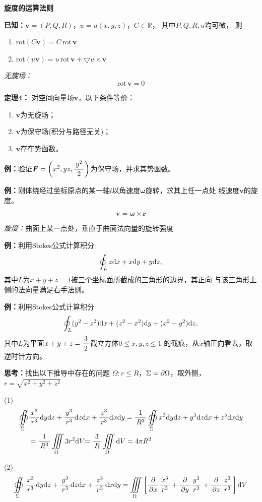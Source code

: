 {\bf 旋度的运算法则}

{\bf 已知：}$\bm{v}=(P,Q,R)$，$u=u(x,y,z)$，$C\in\mathbb{R}$， 
其中$P,Q,R,u$均可微， 则
\begin{enumerate}[(1)]
  \setlength{\itemindent}{1cm}
  \item ${\mathrm{rot}(C\bm{v}) =C\,\mathrm{rot}\,\bm{v}}$ 
  \item ${\mathrm{rot}(u\bm{v}) =u\,\mathrm{rot}\,\bm{v}
  +\bigtriangledown u\times\bm{v}}$
\end{enumerate}

{\it 无旋场：}
$${\mathrm{rot}\,\bm{v}=0}$$ 

{\bf 定理4：}
对空间向量场$\bm{v}$，以下条件等价： 
\begin{enumerate}[(1)]
  \setlength{\itemindent}{1cm}
  \item $\bm{v}$为无旋场； 
  \item $\bm{v}$为保守场(积分与路径无关)； 
  \item $\bm{v}$存在势函数。
\end{enumerate}

{\bf 例：}验证$\bm{F}=\left(x^2,yz,\displaystyle\frac{\,{y^2}\,}{\,{2}\,}\right)$为保守场，并求其势函数。

{\bf 例：}刚体绕经过坐标原点的某一轴$l$以角速度$\bm{\omega}$旋转，求其上任一点处
线速度$\bm{v}$的旋度。

$${\bm{v}=\bm{\omega}\times\bm{r}}$$

{\it 旋度：}曲面上某一点处，垂直于曲面法向量的旋转强度

{\bf 例：}利用Stokes公式计算积分
$$\oint_Lz\mathrm{d} x+x\mathrm{d} y+y\mathrm{d} z,$$
其中$L$为$x+y+z=1$被三个坐标面所截成的三角形的边界，其正向
与该三角形上侧的法向量满足右手法则。

{\bf 例：}利用Stokes公式计算积分
$$\oint_L(y^2-z^2)\mathrm{d} x+(z^2-x^2)\mathrm{d} y+(x^2-y^2)\mathrm{d} z,$$
其中$L$为平面$x+y+z=\displaystyle\frac{\,{3}\,}{\,{2}\,}$截立方体$0\leq x,y,z\leq 1$
的截痕，从$x$轴正向看去，取逆时针方向。

{\bf 思考：}找出以下推导中存在的问题
$\Omega:r\leq R$，$\Sigma=\partial\Omega$，取外侧，
$r=\sqrt{x^2+y^2+z^2}$

(1)
\begin{align*}
	\displaystyle\oiint\limits_{\Sigma}&\displaystyle\frac{\,{x^3}\,}{\,{r^3}\,}\mathrm{d}
  	y\mathrm{d} z+\displaystyle\frac{\,{y^3}\,}{\,{r^3}\,}\mathrm{d} z\mathrm{d} x+\displaystyle\frac{\,{z^3}\,}{\,{r^3}\,}\mathrm{d} x\mathrm{d} y
  	=\displaystyle\frac{\,{1}\,}{\,{R^3}\,}\oiint\limits_{\Sigma}x^3\mathrm{d} y\mathrm{d} z+y^3\mathrm{d} z\mathrm{d} x+z^3\mathrm{d}
  	x\mathrm{d} y\\
  	&=\displaystyle\frac{\,{1}\,}{\,{R^3}\,}\iiint\limits_{\Omega}3r^2\mathrm{d} V{=\displaystyle\frac{\,{3}\,}{\,{R}\,}\iiint\limits_{\Omega}\mathrm{d} V} =4\pi R^2
\end{align*}

(2)
$$\displaystyle\oiint\limits_{\Sigma}\displaystyle\frac{\,{x^3}\,}{\,{r^3}\,}\mathrm{d}
  	y\mathrm{d} z+\displaystyle\frac{\,{y^3}\,}{\,{r^3}\,}\mathrm{d} z\mathrm{d} x+\displaystyle\frac{\,{z^3}\,}{\,{r^3}\,}\mathrm{d} x\mathrm{d} y
  	=\displaystyle\iiint\limits_{\Omega}\left[\displaystyle\frac{\,{\partial}\,}{\,{\partial x}\,}\displaystyle\frac{\,{x^3}\,}{\,{r^3}\,}+\displaystyle\frac{\,{\partial}\,}{\,{\partial
  	y}\,}\displaystyle\frac{\,{y^3}\,}{\,{r^3}\,}+\displaystyle\frac{\,{\partial}\,}{\,{\partial z}\,}\displaystyle\frac{\,{z^3}\,}{\,{r^3}\,}\right]\mathrm{d} V$$

